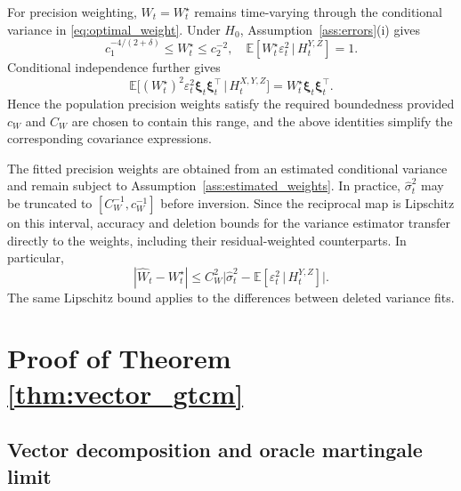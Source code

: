 \documentclass[12pt]{article}
\def\E{\mathbb{E}}
\newcommand\given{\,|\,}
\numberwithin{equation}{section}
\begin{document}
For precision weighting, \(W_t=W_t^\star\) remains time-varying through
the conditional variance in \eqref{eq:optimal_weight}. Under \(H_0\),
Assumption~\ref{ass:errors}(i) gives
\[
c_1^{-4/(2+\delta)}\leq W_t^\star\leq c_2^{-2},\quad
\E[W_t^\star\varepsilon_t^2\given H_t^{Y,Z}]=1.
\]
Conditional independence further gives
\[
\E\big[(W_t^\star)^2\varepsilon_t^2
\boldsymbol\xi_t\boldsymbol\xi_t^\top\given H_t^{X,Y,Z}\big]
=W_t^\star\boldsymbol\xi_t\boldsymbol\xi_t^\top.
\]
Hence the population precision weights satisfy the required boundedness
provided \(c_W\) and \(C_W\) are chosen to contain this range, and the above
identities simplify the corresponding covariance expressions.

The fitted precision weights are obtained from an estimated conditional
variance and remain subject to Assumption~\ref{ass:estimated_weights}.
In practice, \(\hat\sigma_t^2\) may be truncated to
\([C_W^{-1},c_W^{-1}]\) before inversion. Since the reciprocal map is
Lipschitz on this interval, accuracy and deletion bounds for the variance
estimator transfer directly to the weights, including their residual-weighted
counterparts. In particular,
\[
|\hat W_t-W_t^\star|
\leq C_W^2\big|\hat\sigma_t^2-
\E[\varepsilon_t^2\given H_t^{Y,Z}]\big|.
\]
The same Lipschitz bound applies to the differences between deleted
variance fits.





 
\bigskip


\newpage
\appendix

\section{Proof of Theorem \ref{thm:vector_gtcm}}
\label{app:null-proof}

\subsection{Vector decomposition and oracle martingale limit}
\end{document}
